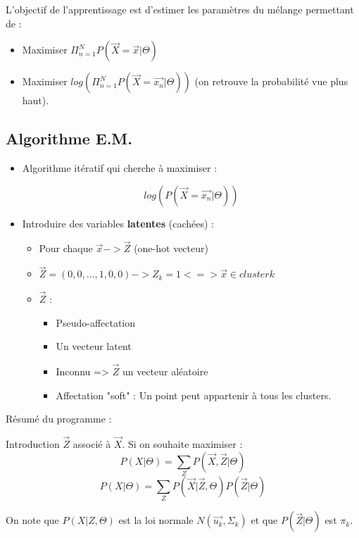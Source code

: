 \documentclass{article}
\begin{document}
L'objectif de l'apprentissage est d'estimer les paramètres du mélange permettant de :

\begin{itemize}
\item Maximiser $ \Pi_{n=1}^N  P(\vec{X} = \vec{x} | \Theta)$

\item Maximiser $log(\Pi_{n=1}^N P(\vec{X} = \vec{x_n} | \Theta))$ (on retrouve la probabilité vue plus haut).

\end{itemize}

\subsection{Algorithme E.M.}

\begin{itemize}

\item Algorithme itératif qui cherche à maximiser : 

\[ log(P(\vec{X} = \vec{x_n} | \Theta))  \]

\item Introduire des variables \textbf{latentes} (cachées) : 

\begin{itemize}

\item Pour chaque $\vec{x} -> \vec{Z}$ (one-hot vecteur)
\item $\vec{Z} = (0, 0, ..., 1, 0, 0) -> Z_k = 1 <=> \vec{x} \in cluster k$
\item $\vec{Z}$ : 
\begin{itemize}
\item Pseudo-affectation
\item Un vecteur latent
\item Inconnu => $\vec{Z}$ un vecteur aléatoire
\item Affectation "soft" : Un point peut appartenir à tous les clusters.
\end{itemize}
\end{itemize}
\end{itemize}

Résumé du programme : 

Introduction $\vec{Z}$ associé à $\vec{X}$. Si on souhaite maximiser : 
\[ P(X | \Theta) = \sum_Z P(\vec{X}, \vec{Z} | \Theta) \]
\[ P(X | \Theta) = \sum_Z P(\vec{X} | \vec{Z}, \Theta) P(\vec{Z} | \Theta) \]

On note que $P(X | Z, \Theta)$ est la loi normale $N(\vec{u_k}, \Sigma_k)$ et que $P(\vec{Z} | \Theta)$ est $\pi_k$.
\end{document}
